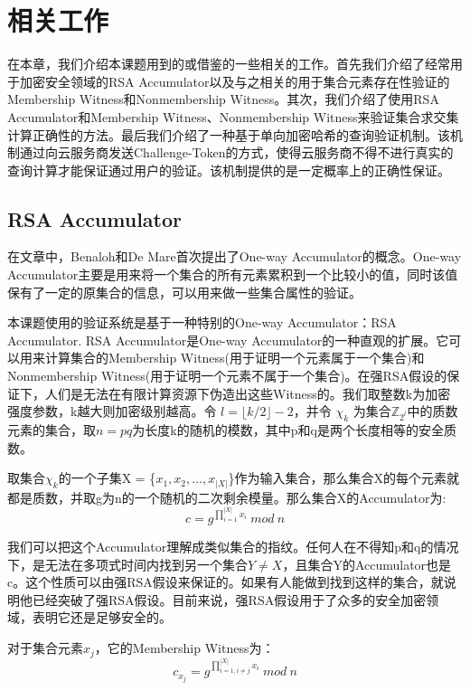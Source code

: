 \chapter{相关工作}
\label{chap:relatedwork}
在本章，我们介绍本课题用到的或借鉴的一些相关的工作。首先我们介绍了经常用于加密安全领域的RSA Accumulator以及与之相关的用于集合元素存在性验证的Membership Witness和Nonmembership Witness。其次，我们介绍了使用RSA Accumulator和Membership Witness、Nonmembership Witness来验证集合求交集计算正确性的方法。最后我们介绍了一种基于单向加密哈希的查询验证机制。该机制通过向云服务商发送Challenge-Token的方式，使得云服务商不得不进行真实的查询计算才能保证通过用户的验证。该机制提供的是一定概率上的正确性保证。

\section{RSA Accumulator}
在文章\cite{benaloh1994one}中，Benaloh和De Mare首次提出了One-way Accumulator的概念。One-way Accumulator主要是用来将一个集合的所有元素累积到一个比较小的值，同时该值保有了一定的原集合的信息，可以用来做一些集合属性的验证。

本课题使用的验证系统是基于一种特别的One-way Accumulator：RSA Accumulator.
RSA Accumulator是One-way Accumulator的一种直观的扩展。它可以用来计算集合的Membership Witness(用于证明一个元素属于一个集合)和Nonmembership Witness(用于证明一个元素不属于一个集合)。在强RSA假设的保证下，人们是无法在有限计算资源下伪造出这些Witness的。我们取整数k为加密强度参数，k越大则加密级别越高。令 $l = \lfloor k/2 \rfloor - 2$，并令 $\chi_k$ 为集合$\mathbb{Z}_{2^l}$中的质数元素的集合，取$n = pq$为长度k的随机的模数，其中p和q是两个长度相等的安全质数。

取集合$\chi_k$的一个子集X = \{$x_1, x_2, ... , x_{|X|}$\}作为输入集合，那么集合X的每个元素就都是质数，并取g为n的一个随机的二次剩余模量。那么集合X的Accumulator为:
\begin{equation} c = g^{\prod_{i = 1}^{|X|} x_i}\ mod\ n \end{equation}

我们可以把这个Accumulator理解成类似集合的指纹。任何人在不得知p和q的情况下，是无法在多项式时间内找到另一个集合$Y \neq X$，且集合Y的Accumulator也是c。这个性质可以由强RSA假设来保证的。如果有人能做到找到这样的集合，就说明他已经突破了强RSA假设。目前来说，强RSA假设用于了众多的安全加密领域，表明它还是足够安全的。

对于集合元素$x_j$，它的Membership Witness为：
\begin{equation} \label{eq:sw} c_{x_j} = g^{\prod_{i=1, i \ne j}^{|X|} x_i}\ mod\ n \end{equation}


